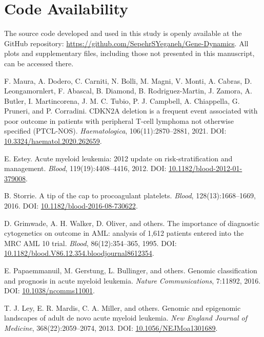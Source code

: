\documentclass[a4paper,12pt]{article}
\begin{document}
\section{Code Availability}
The source code developed and used in this study is openly available at the GitHub repository:  
\url{https://github.com/SepehrSYeganeh/Gene-Dynamics}. 
All plots and supplementary files, including those not presented in this manuscript, can be accessed there.


\begin{thebibliography}{99}
	
	F. Maura, A. Dodero, C. Carniti, N. Bolli, M. Magni, V. Monti, A. Cabras, D. Leongamornlert, F. Abascal, B. Diamond, B. Rodriguez-Martin, J. Zamora, A. Butler, I. Martincorena, J. M. C. Tubio, P. J. Campbell, A. Chiappella, G. Pruneri, and P. Corradini.  
	\newblock CDKN2A deletion is a frequent event associated with poor outcome in patients with peripheral T-cell lymphoma not otherwise specified (PTCL-NOS).  
	\newblock \textit{Haematologica}, 106(11):2870--2881, 2021.  
	DOI: \href{https://doi.org/10.3324/haematol.2020.262659}{10.3324/haematol.2020.262659}.
	
	E. Estey.  
	\newblock Acute myeloid leukemia: 2012 update on risk-stratification and management.  
	\newblock \textit{Blood}, 119(19):4408--4416, 2012.  
	DOI: \href{https://doi.org/10.1182/blood-2012-01-379008}{10.1182/blood-2012-01-379008}.
	
	B. Storrie.  
	\newblock A tip of the cap to procoagulant platelets.  
	\newblock \textit{Blood}, 128(13):1668--1669, 2016.  
	DOI: \href{https://doi.org/10.1182/blood-2016-08-730622}{10.1182/blood-2016-08-730622}.
	
	D. Grimwade, A. H. Walker, D. Oliver, and others.  
	\newblock The importance of diagnostic cytogenetics on outcome in AML: analysis of 1,612 patients entered into the MRC AML 10 trial.  
	\newblock \textit{Blood}, 86(12):354--365, 1995.  
	DOI: \href{https://doi.org/10.1182/blood.V86.12.354.bloodjournal8612354}{10.1182/blood.V86.12.354.bloodjournal8612354}.
	
	E. Papaemmanuil, M. Gerstung, L. Bullinger, and others.  
	\newblock Genomic classification and prognosis in acute myeloid leukemia.  
	\newblock \textit{Nature Communications}, 7:11892, 2016.  
	DOI: \href{https://doi.org/10.1038/ncomms11001}{10.1038/ncomms11001}.
	
	T. J. Ley, E. R. Mardis, C. A. Miller, and others.  
	\newblock Genomic and epigenomic landscapes of adult de novo acute myeloid leukemia.  
	\newblock \textit{New England Journal of Medicine}, 368(22):2059--2074, 2013.  
	DOI: \href{https://doi.org/10.1056/NEJMoa1301689}{10.1056/NEJMoa1301689}.
	
\end{thebibliography}
\end{document}
